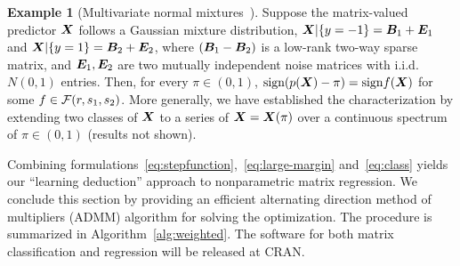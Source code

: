 \documentclass[11pt]{article}
\theoremstyle{definition}
\newtheorem{example}{Example}
\def\sign{\textup{sign}}
\begin{document}
\begin{example}[Multivariate normal mixtures~\citep{hu2020matrix}] Suppose the matrix-valued predictor $\bm X$ follows a Gaussian mixture distribution, $\bm X|\{y=-1\}=\bm B_1+\bm{E}_1$ and $ \bm X|\{y=1\}=\bm B_2+\bm{E}_2$, where $(\bm B_1-\bm B_2)$ is a low-rank two-way sparse matrix, and $\bm{E}_1, \bm{E}_2$ are two mutually independent noise matrices with i.i.d.\ $N(0,1)$ entries. Then, for every $\pi\in(0,1)$, $\sign(p(\mX)-\pi)= \sign f(\mX)$ for some $f\in \mathcal{F}(r,s_1,s_2)$. More generally, we have established the characterization by extending two classes of $\bm X$ to a series of $\bm X=\bm X(\pi)$ over a continuous spectrum of $\pi \in (0,1)$ (results not shown). 

\end{example}

Combining formulations~\eqref{eq:stepfunction},~\eqref{eq:large-margin} and~\eqref{eq:class} yields our ``learning deduction'' approach to nonparametric matrix regression.
 We conclude this section by providing an efficient alternating direction method of multipliers (ADMM) algorithm for solving the optimization. The procedure is summarized in Algorithm~\ref{alg:weighted}. The software for both matrix classification and regression will be released at CRAN.
 
\end{document}

